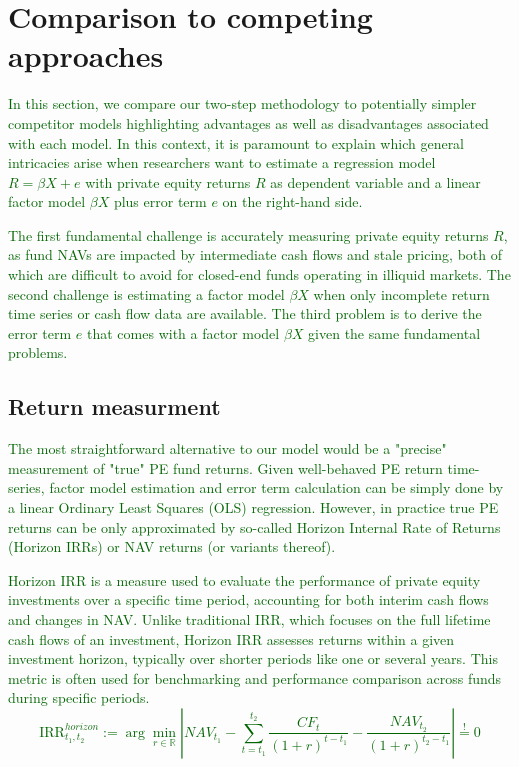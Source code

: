 \clearpage


\section{Comparison to competing approaches}
\label{sec:comparison}

\textcolor{darkgreen}{
	In this section, we compare our two-step methodology to potentially simpler competitor models highlighting advantages as well as disadvantages associated with each model.
	In this context, it is paramount to explain which general intricacies arise when researchers want to estimate a regression model $R = \beta X + e$ with private equity returns $R$ as dependent variable and a linear factor model $\beta X$ plus error term $e$ on the right-hand side.
}

\textcolor{darkgreen}{
	The first fundamental challenge is accurately measuring private equity returns $R$, as fund NAVs are impacted by intermediate cash flows and stale pricing, both of which are difficult to avoid for closed-end funds operating in illiquid markets. 
	The second challenge is estimating a factor model $\beta X$ when only incomplete return time series or cash flow data are available.
	The third problem is to derive the error term $e$ that comes with a factor model $\beta X$ given the same fundamental problems.
}

\subsection{Return measurment}

\textcolor{darkgreen}{
	The most straightforward alternative to our model would be a "precise" measurement of "true" PE fund returns.
	Given well-behaved PE return time-series, factor model estimation and error term calculation can be simply done by a linear Ordinary Least Squares (OLS) regression.
	However, in practice true PE returns can be only approximated by so-called Horizon Internal Rate of Returns (Horizon IRRs) or NAV returns (or variants thereof).
}

\textcolor{darkgreen}{
	Horizon IRR is a measure used to evaluate the performance of private equity investments over a specific time period, accounting for both interim cash flows and changes in NAV.
	Unlike traditional IRR, which focuses on the full lifetime cash flows of an investment, Horizon IRR assesses returns within a given investment horizon, typically over shorter periods like one or several years. 
	This metric is often used for benchmarking and performance comparison across funds during specific periods.
	\[
	\mathrm{IRR}_{t_1,t_2}^{horizon} := \arg \min_{r \in \mathbb{R}} 
	\left| 
	{NAV}_{t_1} -
	\sum_{t=t_1}^{t_2} \frac{{CF}_t}{(1 + r)^{t-t_1}} 
	- \frac{{NAV}_{t_2}}{(1 + r)^{t_2-t_1}}
	\right|
	\stackrel{!}{=} 0
	\]
}

